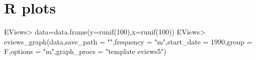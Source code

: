 \documentclass[
]{article}
\newenvironment{Shaded}{\begin{snugshade}}{\end{snugshade}}
\newcommand{\AttributeTok}[1]{\textcolor[rgb]{0.77,0.63,0.00}{#1}}
\newcommand{\DecValTok}[1]{\textcolor[rgb]{0.00,0.00,0.81}{#1}}
\newcommand{\FunctionTok}[1]{\textcolor[rgb]{0.00,0.00,0.00}{#1}}
\newcommand{\NormalTok}[1]{#1}
\newcommand{\OtherTok}[1]{\textcolor[rgb]{0.56,0.35,0.01}{#1}}
\newcommand{\SpecialCharTok}[1]{\textcolor[rgb]{0.00,0.00,0.00}{#1}}
\newcommand{\StringTok}[1]{\textcolor[rgb]{0.31,0.60,0.02}{#1}}
\begin{document}
\hypertarget{r-plots}{%
\section{R plots}\label{r-plots}}

\begin{Shaded}
\end{Shaded}

\begin{Shaded}
\begin{Highlighting}[]
\NormalTok{EViews}\SpecialCharTok{\textgreater{}}\NormalTok{ data}\OtherTok{=}\FunctionTok{data.frame}\NormalTok{(}\AttributeTok{y=}\FunctionTok{runif}\NormalTok{(}\DecValTok{100}\NormalTok{),}\AttributeTok{x=}\FunctionTok{runif}\NormalTok{(}\DecValTok{100}\NormalTok{))}
\NormalTok{EViews}\SpecialCharTok{\textgreater{}} \FunctionTok{eviews\_graph}\NormalTok{(data,}\AttributeTok{save\_path =} \StringTok{""}\NormalTok{,}\AttributeTok{frequency =} \StringTok{"m"}\NormalTok{,}\AttributeTok{start\_date =} \DecValTok{1990}\NormalTok{,}\AttributeTok{group =}\NormalTok{ F,}\AttributeTok{options =} \StringTok{"m"}\NormalTok{,}\AttributeTok{graph\_procs =} \StringTok{"template eviews5"}\NormalTok{)}
\end{Highlighting}
\end{Shaded}
\end{document}

